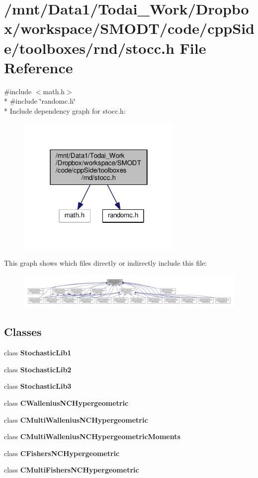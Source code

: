 \section{/mnt/\-Data1/\-Todai\-\_\-\-Work/\-Dropbox/workspace/\-S\-M\-O\-D\-T/code/cpp\-Side/toolboxes/rnd/stocc.h File Reference}
\label{toolboxes_2rnd_2stocc_8h}
{\ttfamily \#include $<$math.\-h$>$}\\*
{\ttfamily \#include \char`\"{}randomc.\-h\char`\"{}}\\*
Include dependency graph for stocc.\-h\-:\nopagebreak
\begin{figure}[H]
\begin{center}
\leavevmode
\includegraphics[width=226pt]{toolboxes_2rnd_2stocc_8h__incl}
\end{center}
\end{figure}
This graph shows which files directly or indirectly include this file\-:\nopagebreak
\begin{figure}[H]
\begin{center}
\leavevmode
\includegraphics[width=350pt]{toolboxes_2rnd_2stocc_8h__dep__incl}
\end{center}
\end{figure}
\subsection*{Classes}
\begin{DoxyCompactItemize}
\item 
class {\bf Stochastic\-Lib1}
\item 
class {\bf Stochastic\-Lib2}
\item 
class {\bf Stochastic\-Lib3}
\item 
class {\bf C\-Wallenius\-N\-C\-Hypergeometric}
\item 
class {\bf C\-Multi\-Wallenius\-N\-C\-Hypergeometric}
\item 
class {\bf C\-Multi\-Wallenius\-N\-C\-Hypergeometric\-Moments}
\item 
class {\bf C\-Fishers\-N\-C\-Hypergeometric}
\item 
class {\bf C\-Multi\-Fishers\-N\-C\-Hypergeometric}
\end{DoxyCompactItemize}
